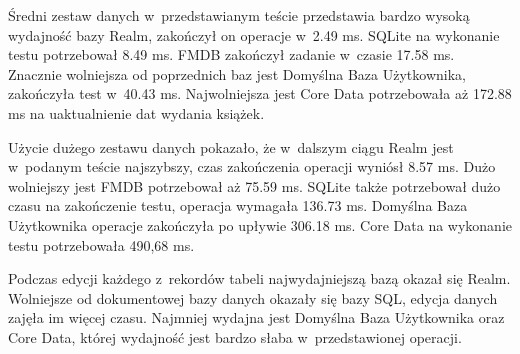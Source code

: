Średni zestaw danych w~przedstawianym teście przedstawia bardzo wysoką wydajność bazy Realm, zakończył on operacje w~2.49 ms. SQLite na wykonanie testu potrzebował 8.49 ms. FMDB zakończył zadanie w~czasie 17.58 ms. Znacznie wolniejsza od poprzednich baz jest Domyślna Baza Użytkownika, zakończyła test w~40.43 ms. Najwolniejsza jest Core Data potrzebowała aż 172.88  ms na uaktualnienie dat wydania książek.

Użycie dużego zestawu danych pokazało, że w~dalszym ciągu Realm jest w~podanym teście najszybszy, czas zakończenia operacji wyniósł 8.57 ms. Dużo wolniejszy jest FMDB potrzebował aż 75.59 ms. SQLite także potrzebował dużo czasu na zakończenie testu, operacja wymagała 136.73 ms. Domyślna Baza Użytkownika operacje zakończyła po upływie 306.18 ms. Core Data na wykonanie testu potrzebowała 490,68 ms. 

Podczas edycji każdego z~rekordów tabeli najwydajniejszą bazą okazał się Realm. Wolniejsze od dokumentowej bazy danych okazały się bazy SQL, edycja danych zajęła im więcej czasu. Najmniej wydajna jest Domyślna Baza Użytkownika oraz Core Data, której wydajność jest bardzo słaba w~przedstawionej operacji. 